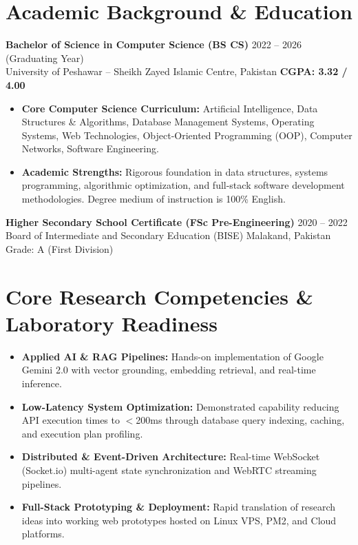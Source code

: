 \documentclass[10pt,a4paper]{article}
\begin{document}
\section{Academic Background \& Education}
\textbf{Bachelor of Science in Computer Science (BS CS)} \hfill 2022 -- 2026 (Graduating Year) \\
University of Peshawar -- Sheikh Zayed Islamic Centre, Pakistan \hfill \textbf{CGPA: 3.32 / 4.00}
\begin{itemize}
    \item \textbf{Core Computer Science Curriculum:} Artificial Intelligence, Data Structures \& Algorithms, Database Management Systems, Operating Systems, Web Technologies, Object-Oriented Programming (OOP), Computer Networks, Software Engineering.
    \item \textbf{Academic Strengths:} Rigorous foundation in data structures, systems programming, algorithmic optimization, and full-stack software development methodologies. Degree medium of instruction is 100\% English.
\end{itemize}

\vspace{3pt}
\textbf{Higher Secondary School Certificate (FSc Pre-Engineering)} \hfill 2020 -- 2022 \\
Board of Intermediate and Secondary Education (BISE) Malakand, Pakistan \hfill Grade: A (First Division)

\section{Core Research Competencies \& Laboratory Readiness}
\begin{itemize}
    \item \textbf{Applied AI \& RAG Pipelines:} Hands-on implementation of Google Gemini 2.0 with vector grounding, embedding retrieval, and real-time inference.
    \item \textbf{Low-Latency System Optimization:} Demonstrated capability reducing API execution times to $<$200ms through database query indexing, caching, and execution plan profiling.
    \item \textbf{Distributed \& Event-Driven Architecture:} Real-time WebSocket (Socket.io) multi-agent state synchronization and WebRTC streaming pipelines.
    \item \textbf{Full-Stack Prototyping \& Deployment:} Rapid translation of research ideas into working web prototypes hosted on Linux VPS, PM2, and Cloud platforms.
\end{itemize}
\end{document}
